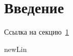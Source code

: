 \documentclass[11pt]{article}
\begin{document}
    \section{Введение}\label{sec:work}
    Ссылка на секцию~\ref{sec:work}

    newLin~\cite{conlan1983massive}

    
    
\end{document}
